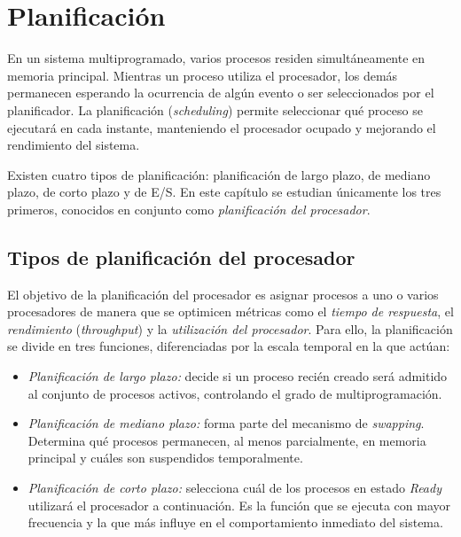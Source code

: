 \chapter{Planificación}

En un sistema multiprogramado, varios procesos residen simultáneamente en memoria principal. Mientras un proceso utiliza el procesador, los demás permanecen esperando la ocurrencia de algún evento o ser seleccionados por el planificador. La planificación (\textit{scheduling}) permite seleccionar qué proceso se ejecutará en cada instante, manteniendo el procesador ocupado y mejorando el rendimiento del sistema.

Existen cuatro tipos de planificación: planificación de largo plazo, de mediano plazo, de corto plazo y de E/S. En este capítulo se estudian únicamente los tres primeros, conocidos en conjunto como \textit{planificación del procesador}.

\section{Tipos de planificación del procesador}

El objetivo de la planificación del procesador es asignar procesos a uno o varios procesadores de manera que se optimicen métricas como el \textit{tiempo de respuesta}, el \textit{rendimiento} (\textit{throughput}) y la \textit{utilización del procesador}. Para ello, la planificación se divide en tres funciones, diferenciadas por la escala temporal en la que actúan:
\begin{itemize}
  \item \textit{Planificación de largo plazo:} decide si un proceso recién creado será admitido al conjunto de procesos activos, controlando el grado de multiprogramación.
  \item \textit{Planificación de mediano plazo:} forma parte del mecanismo de \textit{swapping}. Determina qué procesos permanecen, al menos parcialmente, en memoria principal y cuáles son suspendidos temporalmente.
  \item \textit{Planificación de corto plazo:} selecciona cuál de los procesos en estado \textit{Ready} utilizará el procesador a continuación. Es la función que se ejecuta con mayor frecuencia y la que más influye en el comportamiento inmediato del sistema.
\end{itemize}

